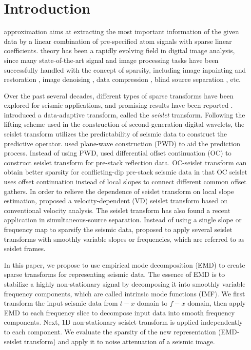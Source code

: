 \section{Introduction}
 approximation aims at extracting the most important information of the given data by a linear combination of pre-specified atom signals with sparse linear coefficients.  theory has been a rapidly evolving field in digital image analysis, since many state-of-the-art signal and image processing tasks have been successfully handled with the concept of sparsity, including image inpainting and restoration \cite[]{elad2005,shuwei20153,shuwei2016cs,amir2017}, image denoising \cite[]{mostafa2016geo,mostafa2017geo,amir2017geo}, data compression \cite[]{bryt2008}, blind source separation \cite[]{zib2001}, etc.

Over the past several decades, different types of sparse transforms have been explored for seismic applications, and promising results have been reported \cite[]{yangkang20142}. 
\cite{fomel2010seislet} introduced a data-adaptive transform, called the \emph{seislet} transform. Following the lifting scheme used in the construction of second-generation digital wavelets, the seislet transform utilizes the predictability of  seismic data to construct the predictive operator. \cite{fomel2010seislet} used plane-wave construction (PWD) to aid the prediction process. Instead of using PWD, \cite{liuyang2010} used differential offset continuation (OC) to construct  seislet transform for pre-stack reflection data.  OC-seislet transform can obtain better sparsity for conflicting-dip pre-stack seismic data in that  OC seislet uses offset continuation instead of local slopes to connect different common offset gathers. %
In order to relieve the dependence of  seislet transform on local slope estimation, \cite{liuyang2015} proposed a velocity-dependent (VD) seislet transform based on conventional velocity analysis. The seislet transform has also found a recent application in simultaneous-source separation. Instead of using a single slope or frequency map to sparsify the seismic data, \cite{fomel2010seislet} proposed to apply several seislet transforms with smoothly variable slopes or frequencies, which are referred to as seislet frames.
 
In this paper, we propose to use empirical mode decomposition (EMD) \cite[]{huangemd} to create sparse transforms for representing seismic data.  The essence of  EMD is to stabilize a highly non-stationary signal by decomposing it into smoothly variable frequency components, which are called  intrinsic mode functions (IMF). We first transform the input seismic data from  $t-x$ domain to  $f-x$ domain, then apply  EMD to each frequency slice to decompose  input data into smooth frequency components. Next,  1D non-stationary seislet transform is applied independently to each component. We evaluate the sparsity of the new representation (EMD-seislet transform) and apply it to noise attenuation of a seismic image.
